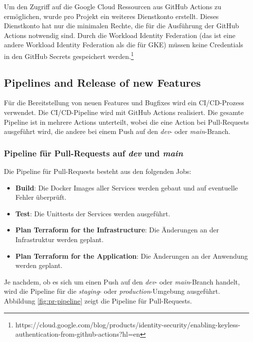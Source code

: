 Um den Zugriff auf die Google Cloud Ressourcen aus GitHub Actions zu ermöglichen,
wurde pro Projekt ein weiteres Dienstkonto erstellt. Dieses Dienstkonto hat nur die minimalen Rechte,
die für die Ausführung der GitHub Actions notwendig sind. Durch die \glqq{}Workload Identity Federation\grqq{}
(das ist eine andere Workload Identity Federation als die für GKE) müssen keine Credentials
in den GitHub Secrets gespeichert werden.\footnote{https://cloud.google.com/blog/products/identity-security/enabling-keyless-authentication-from-github-actions?hl=en}

\subsection{Pipelines and Release of new Features}

Für die Bereitstellung von neuen Features und Bugfixes wird ein CI/CD-Prozess verwendet.
Die CI/CD-Pipeline wird mit GitHub Actions realisiert.
Die gesamte Pipeline ist in mehrere Actions unterteilt, wobei die eine Action bei Pull-Requests ausgeführt wird,
die andere bei einem Push auf den \textit{dev}- oder \textit{main}-Branch.

\subsubsection*{Pipeline für Pull-Requests auf \textit{dev} und \textit{main}}

Die Pipeline für Pull-Requests besteht aus den folgenden Jobs:
\begin{itemize}
  \item \textbf{Build}: Die Docker Images aller Services werden gebaut und auf eventuelle Fehler überprüft.
  \item \textbf{Test}: Die Unittests der Services werden ausgeführt.
  \item \textbf{Plan Terraform for the Infrastructure}: Die Änderungen an der Infrastruktur werden geplant.
  \item \textbf{Plan Terraform for the Application}: Die Änderungen an der Anwendung werden geplant.
\end{itemize}

Je nachdem, ob es sich um einen Push auf den \textit{dev}- oder \textit{main}-Branch handelt, wird die Pipeline
für die \textit{staging}- oder \textit{production}-Umgebung ausgeführt. 
Abbildung \ref{fig:pr-pipeline} zeigt die Pipeline für Pull-Requests.

